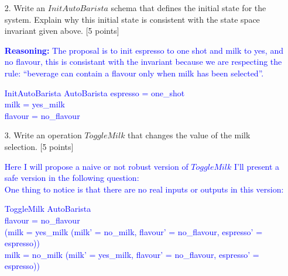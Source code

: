 \documentclass[12pt,fleqn]{article}
\begin{document}
\begin{enumerate}
\begin{enumerate}
\textcolor{blue}{ The invariant that I chosed to use is that if no milk is selected then no flavour can be selected.}

\begin{schema}{AutoBarista}
espresso : Espresso\\
milk : Milk\\
flavour : Flavour
\where
\color{blue}
milk = no\_milk \implies flavour = no\_flavour
\end{schema}

\item[2.] Write an $InitAutoBarista$ schema that defines the initial state for the system. Explain why this initial state is consistent with the state space invariant given above. [5 points]

\textcolor{blue}{
\textbf{Reasoning:} The proposal is to init espresso to one shot and milk to yes, and no flavour, this is consistant with the invariant because we are respecting the rule: ``beverage can contain a flavour only when milk has been selected''. \\
\begin{schema}{InitAutoBarista}
AutoBarista
\where
espresso = one\_shot \\
milk = yes\_milk \\
flavour = no\_flavour \\
\end{schema}
}


\clearpage

\item[3.] Write an operation $ToggleMilk$ that changes the value of the milk selection. [5 points]

  \textcolor{blue}{
    Here I will propose a naive or not robust version of $ToggleMilk$ I'll present a safe version in the following question: \\
    One thing to notice is that there are no real inputs or outputs in this version: \\
    \begin{schema}{ToggleMilk}
  \Delta AutoBarista  \\
  \where
  flavour = no\_flavour \\
  (milk = yes\_milk \implies (milk' = no\_milk, flavour' = no\_flavour, espresso' = espresso)) \\
  \land milk = no\_milk \implies (milk' = yes\_milk, flavour' = no\_flavour, espresso' = espresso))
  \end{schema}
  }


\end{enumerate}
\end{enumerate}
\end{document}
